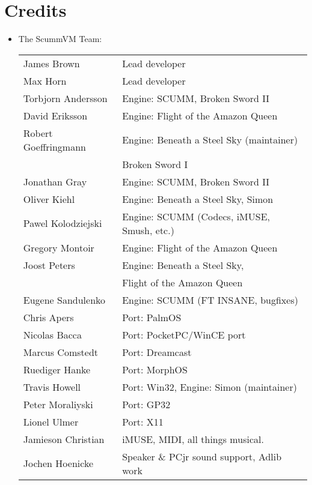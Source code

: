 

\section{Credits}
\begin{itemize}
\item The ScummVM Team:\\
  \begin{tabular}[h]{p{4cm}l}
    James Brown          & Lead developer\\
    Max Horn             & Lead developer\\
    Torbjorn Andersson   & Engine: SCUMM, Broken Sword II\\
    David Eriksson       & Engine: Flight of the Amazon Queen\\
    Robert Goeffringmann & Engine: Beneath a Steel Sky (maintainer)\\
    				& Broken Sword I\\
    Jonathan Gray        & Engine: SCUMM, Broken Sword II\\
    Oliver Kiehl         & Engine: Beneath a Steel Sky, Simon\\
    Pawel Kolodziejski   & Engine: SCUMM (Codecs, iMUSE, Smush, etc.)\\
    Gregory Montoir      & Engine: Flight of the Amazon Queen\\
    Joost Peters         & Engine: Beneath a Steel Sky,\\
                         &         Flight of the Amazon Queen\\
    Eugene Sandulenko    & Engine: SCUMM (FT INSANE, bugfixes)\\
    Chris Apers          & Port: PalmOS\\
    Nicolas Bacca        & Port: PocketPC/WinCE port\\
    Marcus Comstedt      & Port: Dreamcast\\
    Ruediger Hanke       & Port: MorphOS\\
    Travis Howell        & Port: Win32, Engine: Simon (maintainer)\\
    Peter Moraliyski     & Port: GP32\\
    Lionel Ulmer         & Port: X11\\
    Jamieson Christian   & iMUSE, MIDI, all things musical.\\
    Jochen Hoenicke      & Speaker \& PCjr sound support, Adlib work\\

\end{tabular}
\end{itemize}
